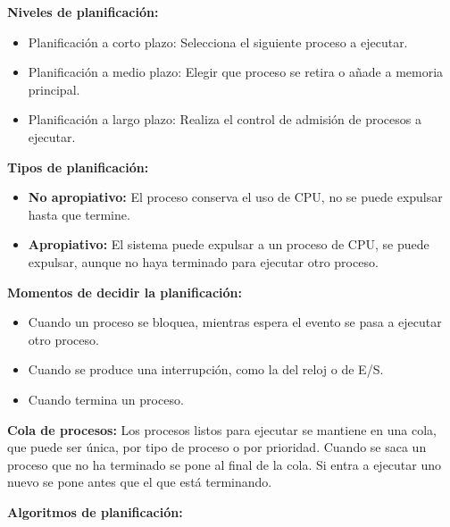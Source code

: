 \documentclass[12pt, twoside, openright]{report} %
\begin{document}
\textbf{Niveles de planificación:}
  

  \begin{itemize}
  \item Planificación a corto plazo: Selecciona el siguiente proceso a
    ejecutar.
    
  \item Planificación a medio plazo: Elegir que proceso se retira o añade a
    memoria principal.
    
  \item Planificación a largo plazo: Realiza el control de admisión de
    procesos a ejecutar.
    
  \end{itemize}
\textbf{Tipos de planificación:}
  

  \begin{itemize}
  \item \textbf{No apropiativo:} El proceso conserva el uso de CPU, no se
    puede expulsar hasta que termine.
    
  \item \textbf{Apropiativo:} El sistema puede expulsar a un proceso de CPU,
    se puede expulsar, aunque no haya terminado para ejecutar otro
    proceso.
    
  \end{itemize}
\textbf{Momentos de decidir la planificación:}
  

  \begin{itemize}
  \item Cuando un proceso se bloquea, mientras espera el evento se pasa a
    ejecutar otro proceso.
    
  \item Cuando se produce una interrupción, como la del reloj o de E/S.
    
  \item Cuando termina un proceso.
    
  \end{itemize}
\textbf{Cola de procesos:} Los procesos listos para ejecutar se
  mantiene en una cola, que puede ser única, por tipo de proceso o por
  prioridad. Cuando se saca un proceso que no ha terminado se pone al
  final de la cola. Si entra a ejecutar uno nuevo se pone antes que el
  que está terminando.
  
\textbf{Algoritmos de planificación:}
  
\end{document}
